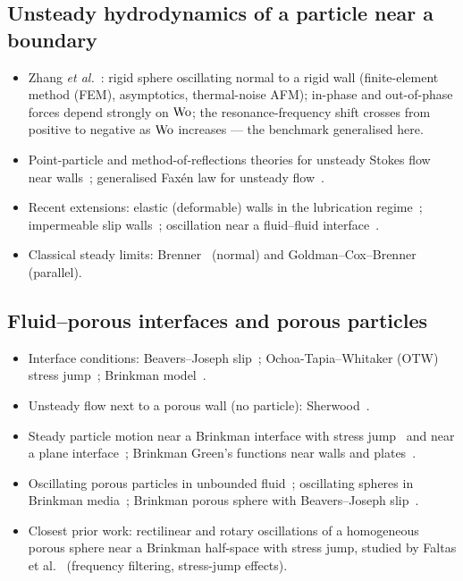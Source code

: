 \subsection*{Unsteady hydrodynamics of a particle near a boundary}
\begin{itemize}
  \item Zhang \emph{et al.}~\cite{zhang2023unsteady}: rigid sphere oscillating normal to a rigid wall (finite-element method (FEM), asymptotics,
        thermal-noise AFM); in-phase and out-of-phase forces depend strongly on $\mathrm{Wo}$; the resonance-frequency shift
        crosses from positive to negative as $\mathrm{Wo}$ increases --- the benchmark generalised here.
  \item Point-particle and method-of-reflections theories for unsteady Stokes flow near walls~\cite{simha2018unsteady};
        generalised Faxén law for unsteady flow~\cite{mazur1974generalization}.
  \item Recent extensions: elastic (deformable) walls in the lubrication regime~\cite{batalha2026elasto};
        impermeable slip walls~\cite{elsapa2022force}; oscillation near a fluid--fluid interface~\cite{faltas2024oscillations}.
  \item Classical steady limits: Brenner~\cite{brenner1961slow} (normal) and Goldman--Cox--Brenner~\cite{goldman1967slow}
        (parallel).
\end{itemize}

\subsection*{Fluid--porous interfaces and porous particles}
\begin{itemize}
  \item Interface conditions: Beavers--Joseph slip~\cite{beavers1967boundary}; Ochoa-Tapia--Whitaker (OTW) stress
        jump~\cite{ochoatapia1995momentum}; Brinkman model~\cite{brinkman1949calculation}.
  \item Unsteady flow next to a porous wall (no particle): Sherwood~\cite{sherwood2020unsteady}.
  \item Steady particle motion near a Brinkman interface with stress jump~\cite{faltas2021axisymmetric} and near a plane
        interface~\cite{richardson1996low}; Brinkman Green's functions near walls and plates~\cite{daddimoussaider2023axisymmetric,daddimoussaider2026asymptotic}.
  \item Oscillating porous particles in unbounded fluid~\cite{prakash2011arbitrary,ollila2012hydrodynamic}; oscillating spheres in
        Brinkman media~\cite{algatheem2025interaction}; Brinkman porous sphere with Beavers--Joseph slip~\cite{elsayed2026effect}.
  \item Closest prior work: rectilinear and rotary oscillations of a homogeneous porous sphere near a Brinkman half-space
        with stress jump, studied by Faltas et al.~\cite{faltas2026rectilinear} (frequency filtering, stress-jump effects).
\end{itemize}

